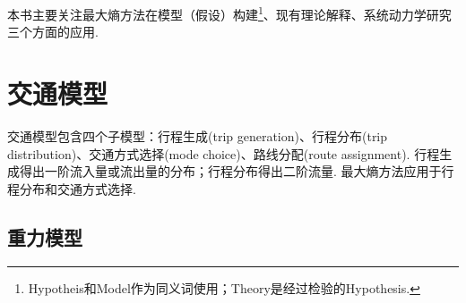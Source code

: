 \par 本书主要关注最大熵方法在模型（假设）构建\footnote{Hypotheis和Model作为同义词使用；Theory是经过检验的Hypothesis. }、现有理论解释、系统动力学研究三个方面的应用. 

\section{交通模型}

\par 交通模型包含四个子模型：行程生成(trip generation)、行程分布(trip distribution)、交通方式选择(mode choice)、路线分配(route assignment). 行程生成得出一阶流入量或流出量的分布；行程分布得出二阶流量. 最大熵方法应用于行程分布和交通方式选择.

\subsection{重力模型}

